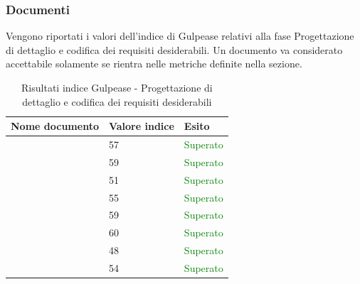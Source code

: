 	 	\subsubsection{Documenti}	 	
	 	Vengono riportati i valori dell'indice di Gulpease relativi alla fase Progettazione di dettaglio e codifica dei requisiti desiderabili. Un documento va considerato accettabile solamente se rientra nelle metriche definite nella sezione.
		\begin{table}[!ht]
			\begin{center}
				\begin{tabularx}{0.9\textwidth}{|l|l|X|}
					\hline
					\textbf{Nome documento} & \textbf{Valore indice} & \textbf{Esito}\\
					\hline						
					\docNameVersionAdR & 57 & \textcolor{green}{Superato}\\
					\hline
					\docNameVersionDdP & 59 & \textcolor{green}{Superato}\\
					\hline
					\docNameVersionGlo & 51 & \textcolor{green}{Superato}\\
					\hline					
					\docNameVersionNdP & 55 & \textcolor{green}{Superato}\\
					\hline					
					\docNameVersionPdP & 59 & \textcolor{green}{Superato}\\
					\hline					
					\docNameVersionPdQ & 60 & \textcolor{green}{Superato}\\
					\hline					
					\docNameVersionSdF & 48 & \textcolor{green}{Superato}\\
					\hline	
					\docNameVersionST & 54 & \textcolor{green}{Superato}\\
					\hline			
				\end{tabularx}
			\end{center}
			\caption{Risultati indice Gulpease - Progettazione di dettaglio e codifica dei requisiti desiderabili}
		\end{table}
	
\pagebreak